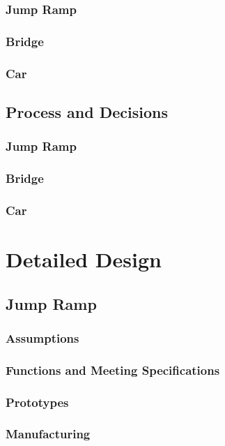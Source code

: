 \documentclass[fleqn,12pt]{project}
\begin{document}
\subsubsection{Jump Ramp}
\subsubsection{Bridge}
\subsubsection{Car}

\subsection{Process and Decisions}
\subsubsection{Jump Ramp}
\subsubsection{Bridge}
\subsubsection{Car}

\newpage
\section{Detailed Design}
\subsection{Jump Ramp}
\subsubsection{Assumptions}
\subsubsection{Functions and Meeting Specifications}
\subsubsection{Prototypes}
\subsubsection{Manufacturing}
\end{document}

